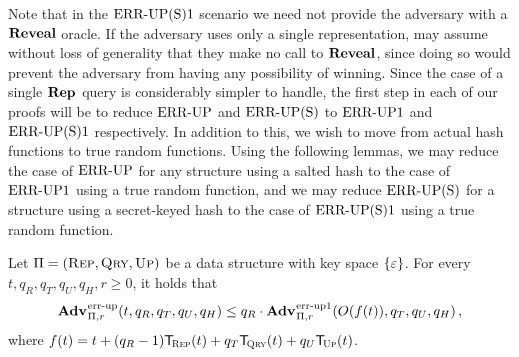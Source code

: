 
%

Note that in the $\textnormal{ERR\mbox{-}UP(S)}1$ scenario we need not provide the adversary with a $\mathbf{Reveal}$ oracle. If the adversary uses only a single representation, may assume without loss of generality that they make no call to $\mathbf{Reveal}$, since doing so would prevent the adversary from having any possibility of winning. Since the case of a single $\mathbf{Rep}\hspace{0.5pt}$ query is considerably simpler to handle, the first step in each of our proofs will be to reduce $\textnormal{ERR\mbox{-}UP}$ and $\textnormal{ERR\mbox{-}UP(S)}$ to $\textnormal{ERR\mbox{-}UP}1$ and $\textnormal{ERR\mbox{-}UP(S)}1$ respectively. In addition to this, we wish to move from actual hash functions to true random functions. Using the following lemmas, we may reduce the case of $\textnormal{ERR\mbox{-}UP}$ for any structure using a salted hash to the case of $\textnormal{ERR\mbox{-}UP}1$ using a true random function, and we may reduce $\textnormal{ERR\mbox{-}UP(S)}$ for a structure using a secret-keyed hash to the case of $\textnormal{ERR\mbox{-}UP(S)}1$ using a true random function.

\begin{lemma}\label{lemma:errep}
  Let $\mathrm{\Pi} = (\textsc{Rep}, \textsc{Qry}, \textsc{Up})$ be a data structure with key
  space $\{\varepsilon\}$. For every $t, q_R, q_T, q_U, q_H, r\geq 0$, it holds that
  \[
    \Adv{\errep}_{\struct,r}(t, q_R, q_T, q_U, q_H) \leq
    q_R\cdot\Adv{\errep1}_{\struct,r}(O(f(t)), q_T, q_U, q_H) \,,
  \]
  where $f(t) = t + (q_R-1)\ticks(\Rep,t) + q_T\ticks(\Qry,t) + q_U\ticks(\Up,t)$.
\end{lemma}

